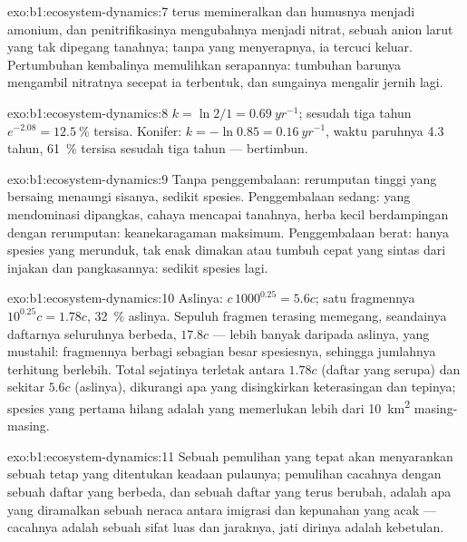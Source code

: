 \begin{solution}{exo:b1:ecosystem-dynamics:7}
 terus memineralkan  dan humusnya menjadi amonium,
dan penitrifikasinya mengubahnya menjadi nitrat, sebuah anion larut
yang tak dipegang tanahnya; tanpa  yang menyerapnya, ia tercuci
keluar. Pertumbuhan kembalinya memulihkan serapannya: tumbuhan barunya
mengambil nitratnya secepat ia terbentuk, dan sungainya mengalir
jernih lagi.
\end{solution}

\begin{solution}{exo:b1:ecosystem-dynamics:8}
$k = \ln 2/1 = \qty{0.69}{yr^{-1}}$; sesudah tiga tahun $e^{-2.08} =
\qty{12.5}{\%}$ tersisa. Konifer: $k = -\ln 0.85 = \qty{0.16}{yr^{-1}}$,
waktu paruhnya \num{4.3} tahun, \qty{61}{\%} tersisa sesudah tiga tahun
---  bertimbun.
\end{solution}

\begin{solution}{exo:b1:ecosystem-dynamics:9}
Tanpa penggembalaan: rerumputan tinggi yang bersaing menaungi sisanya,
sedikit spesies. Penggembalaan sedang: yang mendominasi dipangkas,
cahaya mencapai tanahnya, herba kecil berdampingan dengan rerumputan:
keanekaragaman maksimum. Penggembalaan berat: hanya spesies yang
merunduk, tak enak dimakan atau tumbuh cepat yang sintas dari injakan
dan pangkasannya: sedikit spesies lagi.
\end{solution}

\begin{solution}{exo:b1:ecosystem-dynamics:10}
Aslinya: $c\,1000^{0.25} = 5.6c$; satu fragmennya $10^{0.25}c = 1.78c$,
\qty{32}{\%} aslinya. Sepuluh fragmen terasing memegang, seandainya
daftarnya seluruhnya berbeda, $17.8c$ --- lebih banyak daripada
aslinya, yang mustahil: fragmennya berbagi sebagian besar spesiesnya,
sehingga jumlahnya terhitung berlebih. Total sejatinya terletak antara
$1.78c$ (daftar yang serupa) dan sekitar $5.6c$ (aslinya), dikurangi
apa yang disingkirkan keterasingan dan tepinya; spesies yang pertama
hilang adalah yang memerlukan lebih dari \qty{10}{km^2} masing-masing.
\end{solution}

\begin{solution}{exo:b1:ecosystem-dynamics:11}
Sebuah pemulihan yang tepat akan menyarankan sebuah  tetap
yang ditentukan keadaan pulaunya; pemulihan cacahnya dengan sebuah
daftar yang berbeda, dan sebuah daftar yang terus berubah, adalah apa
yang diramalkan sebuah neraca antara imigrasi dan kepunahan yang acak
--- cacahnya adalah sebuah sifat luas dan jaraknya, jati dirinya
adalah kebetulan.
\end{solution}

